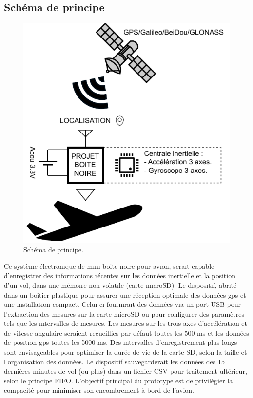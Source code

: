 \subsection{Schéma de principe}
\begin{figure}[h]
	\centering
	\includegraphics[width=0.4\linewidth]{../figures/cdc/schema_principe}
	\caption{Schéma de principe.}
	\label{fig:schemaprincipe}
\end{figure}

Ce système électronique de mini boîte noire pour avion, serait capable d'enregistrer des informations récentes sur les données inertielle et la position d'un vol, dans une mémoire non volatile (carte microSD). Le dispositif, abrité dans un boîtier plastique pour assurer une réception optimale des données \gls{gps} et une installation compact. Celui-ci fournirait des données via un port USB pour l'extraction des mesures sur la carte microSD ou pour configurer des paramètres tels que les intervalles de mesures. Les mesures sur les trois axes d'accélération et de vitesse angulaire seraient recueillies par défaut toutes les 500 ms et les données de position \gls{gps} toutes les 5000 ms. Des intervalles d'enregistrement plus longs sont envisageables pour optimiser la durée de vie de la carte SD, selon la taille et l'organisation des données. Le dispositif sauvegarderait les données des 15 dernières minutes de vol (ou plus) dans un fichier CSV pour traitement ultérieur, selon le principe FIFO. L'objectif principal du prototype est de privilégier la compacité pour minimiser son encombrement à bord de l'avion.


\clearpage

